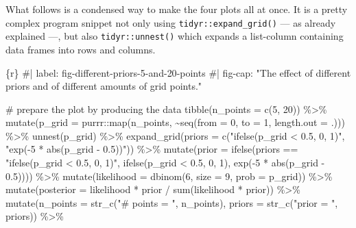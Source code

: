 \documentclass[
  letterpaper,
  DIV=11,
  numbers=noendperiod]{scrreprt}
\newenvironment{Shaded}{\begin{snugshade}}{\end{snugshade}}
\newcommand{\AttributeTok}[1]{\textcolor[rgb]{0.40,0.45,0.13}{#1}}
\newcommand{\CommentTok}[1]{\textcolor[rgb]{0.37,0.37,0.37}{#1}}
\newcommand{\DecValTok}[1]{\textcolor[rgb]{0.68,0.00,0.00}{#1}}
\newcommand{\FloatTok}[1]{\textcolor[rgb]{0.68,0.00,0.00}{#1}}
\newcommand{\FunctionTok}[1]{\textcolor[rgb]{0.28,0.35,0.67}{#1}}
\newcommand{\InformationTok}[1]{\textcolor[rgb]{0.37,0.37,0.37}{#1}}
\newcommand{\NormalTok}[1]{\textcolor[rgb]{0.00,0.23,0.31}{#1}}
\newcommand{\SpecialCharTok}[1]{\textcolor[rgb]{0.37,0.37,0.37}{#1}}
\newcommand{\StringTok}[1]{\textcolor[rgb]{0.13,0.47,0.30}{#1}}
\begin{document}
What follows is a condensed way to make the four plots all at once. It
is a pretty complex program snippet not only using
\texttt{tidyr::expand\_grid()} --- as already explained ---, but also
\texttt{tidyr::unnest()} which expands a list-column containing data
frames into rows and columns.

\begin{Shaded}
\begin{Highlighting}[]
\InformationTok{\textasciigrave{}\textasciigrave{}\textasciigrave{}\{r\}}
\CommentTok{\#| label: fig{-}different{-}priors{-}5{-}and{-}20{-}points}
\CommentTok{\#| fig{-}cap: "The effect of different priors and of different amounts of grid points."}


\CommentTok{\# prepare the plot by producing the data}
\FunctionTok{tibble}\NormalTok{(}\AttributeTok{n\_points =} \FunctionTok{c}\NormalTok{(}\DecValTok{5}\NormalTok{, }\DecValTok{20}\NormalTok{)) }\SpecialCharTok{\%\textgreater{}\%} 
  \FunctionTok{mutate}\NormalTok{(}\AttributeTok{p\_grid =}\NormalTok{ purrr}\SpecialCharTok{::}\FunctionTok{map}\NormalTok{(n\_points, }\SpecialCharTok{\textasciitilde{}}\FunctionTok{seq}\NormalTok{(}\AttributeTok{from =} \DecValTok{0}\NormalTok{, }\AttributeTok{to =} \DecValTok{1}\NormalTok{, }\AttributeTok{length.out =}\NormalTok{ .))) }\SpecialCharTok{\%\textgreater{}\%} 
  \FunctionTok{unnest}\NormalTok{(p\_grid) }\SpecialCharTok{\%\textgreater{}\%} 
  \FunctionTok{expand\_grid}\NormalTok{(}\AttributeTok{priors =} \FunctionTok{c}\NormalTok{(}\StringTok{"ifelse(p\_grid \textless{} 0.5, 0, 1)"}\NormalTok{, }\StringTok{"exp({-}5 * abs(p\_grid {-} 0.5))"}\NormalTok{)) }\SpecialCharTok{\%\textgreater{}\%} 
  \FunctionTok{mutate}\NormalTok{(}\AttributeTok{prior =} \FunctionTok{ifelse}\NormalTok{(priors }\SpecialCharTok{==} \StringTok{"ifelse(p\_grid \textless{} 0.5, 0, 1)"}\NormalTok{, }
                        \FunctionTok{ifelse}\NormalTok{(p\_grid }\SpecialCharTok{\textless{}} \FloatTok{0.5}\NormalTok{, }\DecValTok{0}\NormalTok{, }\DecValTok{1}\NormalTok{),}
                        \FunctionTok{exp}\NormalTok{(}\SpecialCharTok{{-}}\DecValTok{5} \SpecialCharTok{*} \FunctionTok{abs}\NormalTok{(p\_grid }\SpecialCharTok{{-}} \FloatTok{0.5}\NormalTok{)))) }\SpecialCharTok{\%\textgreater{}\%} 
  \FunctionTok{mutate}\NormalTok{(}\AttributeTok{likelihood =} \FunctionTok{dbinom}\NormalTok{(}\DecValTok{6}\NormalTok{, }\AttributeTok{size =} \DecValTok{9}\NormalTok{, }\AttributeTok{prob =}\NormalTok{ p\_grid)) }\SpecialCharTok{\%\textgreater{}\%} 
  \FunctionTok{mutate}\NormalTok{(}\AttributeTok{posterior =}\NormalTok{ likelihood }\SpecialCharTok{*}\NormalTok{ prior }\SpecialCharTok{/} \FunctionTok{sum}\NormalTok{(likelihood }\SpecialCharTok{*}\NormalTok{ prior)) }\SpecialCharTok{\%\textgreater{}\%} 
  \FunctionTok{mutate}\NormalTok{(}\AttributeTok{n\_points =} \FunctionTok{str\_c}\NormalTok{(}\StringTok{"\# points = "}\NormalTok{, n\_points),}
         \AttributeTok{priors   =} \FunctionTok{str\_c}\NormalTok{(}\StringTok{"prior = "}\NormalTok{, priors)) }\SpecialCharTok{\%\textgreater{}\%} 
  

\end{Highlighting}
\end{Shaded}
\end{document}
